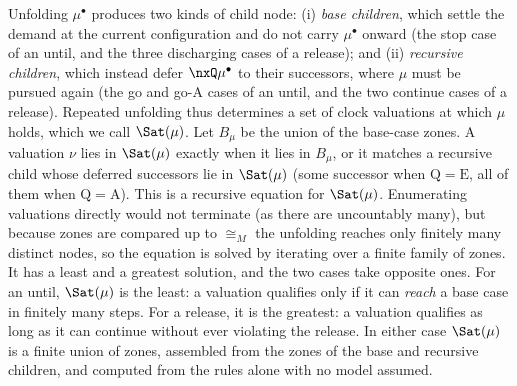 

Unfolding $\mu^\bullet$ produces two kinds of child node: (i) \emph{base children}, which settle the demand at the current configuration and do not carry $\mu^\bullet$ onward (the stop case of an until, and the three discharging cases of a release); and (ii) \emph{recursive children}, which instead defer $\nxQ\mu^\bullet$ to their successors, where $\mu$ must be pursued again (the go and go-A cases of an until, and the two continue cases of a release). Repeated unfolding thus determines a set of clock valuations at which $\mu$ holds, which we call $\Sat(\mu)$. Let $B_\mu$ be the union of the base-case zones. A valuation $\nu$ lies in $\Sat(\mu)$ exactly when it lies in $B_\mu$, or it matches a recursive child whose deferred successors lie in $\Sat(\mu)$ (some successor when $\mathrm{Q}=\mathrm{E}$, all of them when $\mathrm{Q}=\mathrm{A}$). This is a recursive equation for $\Sat(\mu)$. Enumerating valuations directly would not terminate (as there are uncountably many), but because zones are compared up to $\cong_M$ the unfolding reaches only finitely many distinct nodes, so the equation is solved by iterating over a finite family of zones. It has a least and a greatest solution, and the two cases take opposite ones. For an until, $\Sat(\mu)$ is the least: a valuation qualifies only if it can \emph{reach} a base case in finitely many steps. For a release, it is the greatest: a valuation qualifies as long as it can continue without ever violating the release. In either case $\Sat(\mu)$ is a finite union of zones, assembled from the zones of the base and recursive children, and computed from the rules alone with no model assumed.



